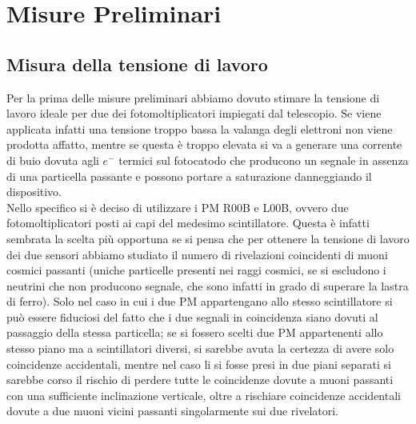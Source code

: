 \documentclass{standalone}
\begin{document}
	\chapter{Misure Preliminari}                %



	\section{Misura della tensione di lavoro}
	\label{sec:tension}                %
	Per la prima delle misure preliminari abbiamo dovuto stimare la tensione di lavoro ideale per due dei fotomoltiplicatori impiegati dal telescopio. Se viene applicata infatti una tensione troppo bassa la valanga degli elettroni non viene prodotta affatto, mentre se questa \`e troppo elevata si va a generare una corrente di buio dovuta agli $e^-$ termici sul fotocatodo che producono un segnale in assenza di una particella passante e possono portare a saturazione danneggiando il dispositivo.\\
	Nello specifico si \`e deciso di utilizzare i PM R00B e L00B, ovvero due fotomoltiplicatori posti ai capi del medesimo scintillatore. Questa \`e infatti sembrata la scelta pi\`u opportuna se si pensa che per ottenere la tensione di lavoro dei due sensori abbiamo studiato il numero di rivelazioni coincidenti  di muoni cosmici passanti (uniche particelle presenti nei raggi cosmici, se si escludono i neutrini che non producono segnale, che sono infatti in grado di superare la lastra di ferro). Solo nel caso in cui i due PM appartengano allo stesso scintillatore si pu\`o essere fiduciosi del fatto che i due segnali in coincidenza siano dovuti al passaggio della stessa particella; se si fossero scelti due PM appartenenti allo stesso piano ma a scintillatori diversi, si sarebbe avuta la certezza di avere solo coincidenze accidentali, mentre nel caso li si fosse presi in due piani separati si sarebbe corso il rischio di perdere tutte le coincidenze dovute a muoni passanti con una sufficiente inclinazione verticale, oltre a rischiare coincidenze accidentali dovute a due muoni vicini passanti singolarmente sui due rivelatori.\\
\end{document}
